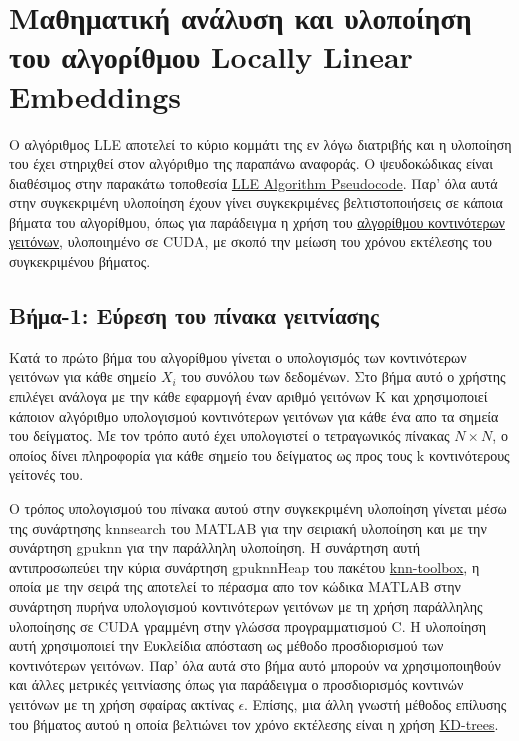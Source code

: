 \section{Μαθηματική ανάλυση και υλοποίηση του αλγορίθμου \textlatin{Locally Linear Embeddings}}
\par
Ο αλγόριθμος \textlatin{LLE}\cite{lle} αποτελεί το κύριο κομμάτι της εν λόγω διατριβής και η υλοποίηση του έχει στηριχθεί στον αλγόριθμο της παραπάνω αναφοράς. Ο ψευδοκώδικας είναι διαθέσιμος στην παρακάτω τοποθεσία \href{https://www.cs.nyu.edu/~roweis/lle/algorithm.html}{\textlatin{LLE Algorithm Pseudocode}}. Παρ' όλα αυτά στην συγκεκριμένη υλοποίηση έχουν γίνει συγκεκριμένες βελτιστοποιήσεις σε κάποια βήματα του αλγορίθμου, όπως για παράδειγμα η χρήση του \href{http://autogpu.ee.auth.gr/doku.php?id=cuknns:gpu_accelerated_k-nearest_neighbor_library}{αλγορίθμου κοντινότερων γειτόνων}, υλοποιημένο σε \textlatin{CUDA}, με σκοπό την μείωση του χρόνου εκτέλεσης του συγκεκριμένου βήματος. 

\subsection{Βήμα-1: Εύρεση του πίνακα γειτνίασης}
\par
Κατά το πρώτο βήμα του αλγορίθμου γίνεται ο υπολογισμός των κοντινότερων γειτόνων για κάθε σημείο $X_{i}$ του συνόλου των δεδομένων. Στο βήμα αυτό ο χρήστης επιλέγει ανάλογα με την κάθε εφαρμογή έναν αριθμό γειτόνων \textlatin{K} και χρησιμοποιεί κάποιον αλγόριθμο υπολογισμού κοντινότερων γειτόνων για κάθε ένα απο τα σημεία του δείγματος. Με τον τρόπο αυτό έχει υπολογιστεί ο τετραγωνικός πίνακας $N \times N$, ο οποίος δίνει πληροφορία για κάθε σημείο του δείγματος ως προς τους \textlatin{k} κοντινότερους γείτονές του.
\par
Ο τρόπος υπολογισμού του πίνακα αυτού στην συγκεκριμένη υλοποίηση γίνεται μέσω της συνάρτησης \textlatin{knnsearch} του \textlatin{MATLAB} για την σειριακή υλοποίηση και με την συνάρτηση \textlatin{gpu\textunderscore knn} για την παράλληλη υλοποίηση. Η συνάρτηση αυτή αντιπροσωπεύει την κύρια συνάρτηση \textlatin{gpuknnHeap} του πακέτου \href{http://autogpu.ee.auth.gr/doku.php?id=cuknns:gpu_accelerated_k-nearest_neighbor_library}{\textlatin{knn-toolbox}}, η οποία με την σειρά της αποτελεί το πέρασμα απο τον κώδικα \textlatin{MATLAB} στην συνάρτηση πυρήνα υπολογισμού κοντινότερων γειτόνων με τη χρήση παράλληλης υλοποίησης σε \textlatin{CUDA} γραμμένη στην γλώσσα προγραμματισμού \textlatin{C}. Η υλοποίηση αυτή χρησιμοποιεί την Ευκλείδια απόσταση ως μέθοδο προσδιορισμού των κοντινότερων γειτόνων. Παρ' όλα αυτά στο βήμα αυτό μπορούν να χρησιμοποιηθούν και άλλες μετρικές γειτνίασης όπως για παράδειγμα ο προσδιορισμός κοντινών γειτόνων με τη χρήση σφαίρας ακτίνας $\epsilon$. Επίσης, μια άλλη γνωστή μέθοδος επίλυσης του βήματος αυτού η οποία βελτιώνει τον χρόνο εκτέλεσης είναι η χρήση \href{https://en.wikipedia.org/wiki/K-d_tree}{\textlatin{KD-trees}}.

